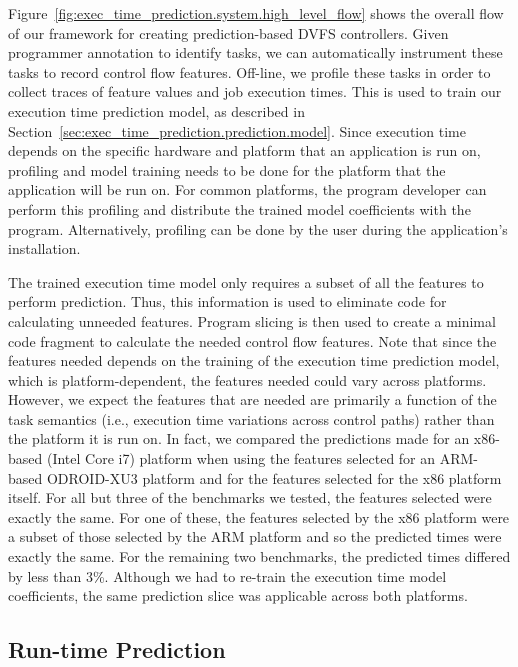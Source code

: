 Figure~\ref{fig:exec_time_prediction.system.high_level_flow} shows the overall
flow of our framework for creating prediction-based DVFS controllers. Given
programmer annotation to identify tasks, we can automatically instrument these
tasks to record control flow features. Off-line, we profile these tasks in
order to collect traces of feature values and job execution times.  This is
used to train our execution time prediction model, as described in
Section~\ref{sec:exec_time_prediction.prediction.model}. Since execution time
depends on the specific hardware and platform that an application is run on,
profiling and model training needs to be done for the platform that the
application will be run on. For common platforms, the program developer can
perform this profiling and distribute the trained model coefficients with the
program. Alternatively, profiling can be done by the user during the
application's installation.

The trained execution time model only requires a subset of all the features to
perform prediction. Thus, this information is used to eliminate code for
calculating unneeded features.  Program slicing is then used to create a
minimal code fragment to calculate the needed control flow features.  Note that
since the features needed depends on the training of the execution time
prediction model, which is platform-dependent, the features needed could vary
across platforms.  However, we expect the features that are needed are
primarily a function of the task semantics (i.e., execution time variations
across control paths) rather than the platform it is run on. In fact, we
compared the predictions made for an x86-based (Intel Core i7) platform when
using the features selected for an ARM-based ODROID-XU3 platform and for the
features selected for the x86 platform itself. For all but three of the
benchmarks we tested, the features selected were exactly the same.  For one of
these, the features selected by the x86 platform were a subset of those
selected by the ARM platform and so the predicted times were exactly the same.
For the remaining two benchmarks, the predicted times differed by less than
3\%. Although we had to re-train the execution time model coefficients, the
same prediction slice was applicable across both platforms.

\subsection{Run-time Prediction}

